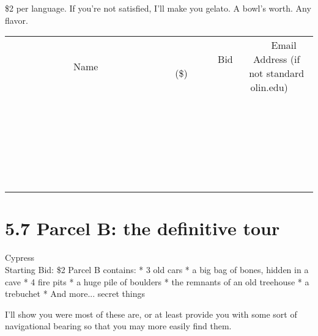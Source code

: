 \documentclass[11pt]{article}
\begin{document}
\$2 per language. If you're not satisfied, I'll make you gelato. A bowl's worth. Any flavor.
\\[6ex]
\begin{tabular}{c c c}
~~~~~~~~~~~~~Name~~~~~~~~~~~~~ & ~~~~~~~~~Bid (\$)~~~~~~~~~  & ~~~Email Address (if not standard olin.edu)~~~\\
 & & \\
\hline
 & & \\
\hline
 & & \\
\hline
 & & \\
\hline
 & & \\
\hline
 & & \\
\hline
 & & \\
\hline
 & & \\
\hline
 & & \\
\hline
 & & \\
\hline
 & & \\
\hline
 & & \\
\hline
 & & \\
\hline
 & & \\
\hline
 & & \\
\hline
 & & \\
\hline
 & & \\
\hline
 & & \\
\hline
 & & \\
\hline
 & & \\
\hline
 & & \\
\hline
 & & \\
\hline
 & & \\
\hline
 & & \\
\hline
 & & \\
\hline
 & & \\
\hline
\end{tabular}
\newpage
\section*{5.7 Parcel B: the definitive tour}
Cypress
\\
Starting Bid: \$2
\newline
Parcel B contains:
* 3 old cars
* a big bag of bones, hidden in a cave
* 4 fire pits
* a huge pile of boulders
* the remnants of an old treehouse
* a trebuchet
* And more... secret things

I'll show you were most of these are, or at least provide you with some sort of navigational bearing so that you may more easily find them.
\end{document}
